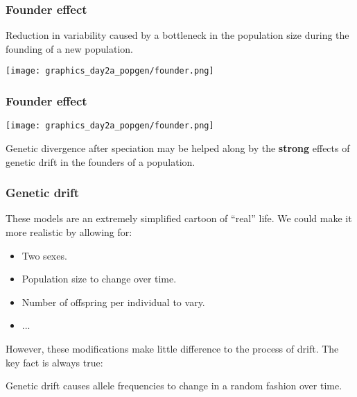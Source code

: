 \documentclass{beamer}
\newcommand{\1}{\ensuremath{\mathbf{1}}}
\begin{document}
%
%
%
\begin{frame}\frametitle{Founder effect}
	\begin{block}{}
		Reduction in variability caused by a bottleneck in the population size during the founding of a new population.
	\end{block}
	\begin{center}
		\texttt{[image: graphics\_day2a\_popgen/founder.png]}
	\end{center}
\end{frame}
%
%
%
\begin{frame}\frametitle{Founder effect}
	\begin{center}
		\texttt{[image: graphics\_day2a\_popgen/founder.png]}
	\end{center}
	\begin{block}{}
		Genetic divergence after speciation may be helped along by the \textbf{strong} effects of genetic drift in the founders of a population.
	\end{block}
\end{frame}
%
%
%
\begin{frame}\frametitle{Genetic drift}
	These models are an extremely simplified cartoon of ``real'' life. We could make it more realistic by allowing for:
	\begin{itemize}
		\item Two sexes.
		\item Population size to change over time.
		\item Number of offspring per individual to vary.
		\item ...
	\end{itemize}
	However, these modifications make little difference to the process of drift. The key fact is always true:
	\begin{block}{}
		Genetic drift causes allele frequencies to change in a random fashion over time.
	\end{block}
\end{frame}
\end{document}

